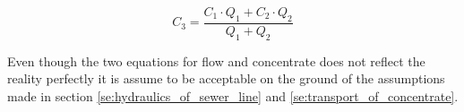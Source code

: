 \begin{equation}\label{poop_addition_interconnection}
	\boxed{C_3 = \frac{C_1 \cdot Q_1 + C_2 \cdot Q_2}{Q_1 + Q_2}}
\end{equation}

Even though the two equations for flow and concentrate does not reflect the reality perfectly it is assume to be acceptable on the ground of the assumptions made in section \ref{se:hydraulics_of_sewer_line} and \ref{se:transport_of_concentrate}.



